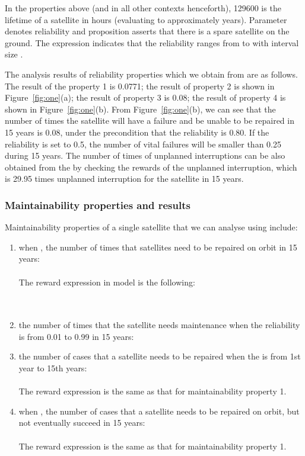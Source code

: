 \documentclass[preprint,12pt]{qrei}
\begin{document}
In the properties above (and in all other contexts henceforth), 129600 is the lifetime of a satellite in hours (evaluating to approximately  years). Parameter  denotes reliability and proposition  asserts that there is a spare satellite on the ground. 
The expression  indicates that the reliability ranges from  to  with interval size . 

The analysis results of reliability properties which we obtain from  are as follows. The result of the property 1 is 0.0771; the result of property 2 is shown in Figure~\ref{fig:one}(a); the result of property 3 is 0.08; the result of property 4 is shown in Figure~\ref{fig:one}(b). From Figure~\ref{fig:one}(b), we can see that the number of times the satellite will have a failure and be unable to be repaired in 15 years is 0.08, under the precondition that the reliability is 0.80. If the reliability is set to 0.5, the number of vital failures will be smaller than 0.25 during 15 years. The number of times of unplanned interruptions can be also obtained from the  by checking the rewards of the unplanned interruption, which is 29.95 times unplanned interruption for the satellite in 15 years.


\subsubsection{Maintainability properties and results}

Maintainability properties of a single satellite that we can analyse using  include:

\begin{enumerate}
\item when , the number of times that satellites need to be repaired on orbit in 15 years:\\
\\
The reward expression in  model is the following:\\
\\
\\

\item the number of times that the satellite needs maintenance when the reliability is from 0.01 to 0.99 in 15 years:\\

\item the number of cases that a satellite needs to be repaired when the  is from 1st year to 15th years:\\
\\
The reward expression is the same as that for maintainability property 1.
\item when , the number of cases that a satellite needs to be repaired on orbit, but not eventually succeed in 15 years:\\
\\
The reward expression is the same as that for maintainability property 1.
\end{enumerate}
\end{document}
